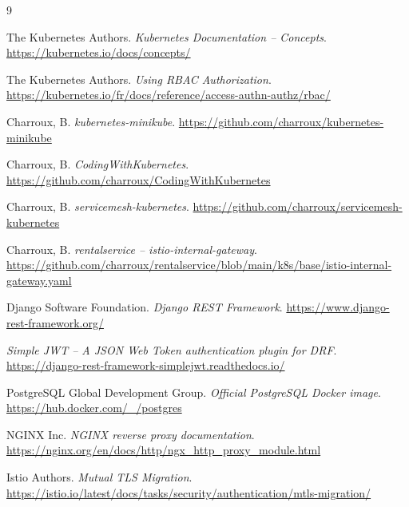 \documentclass[11pt,a4paper]{article}
\begin{document}
\renewcommand{\refname}{Références}
\begin{thebibliography}{9}

The Kubernetes Authors. \emph{Kubernetes Documentation -- Concepts}. \url{https://kubernetes.io/docs/concepts/}

The Kubernetes Authors. \emph{Using RBAC Authorization}. \url{https://kubernetes.io/fr/docs/reference/access-authn-authz/rbac/}

Charroux, B. \emph{kubernetes-minikube}. \url{https://github.com/charroux/kubernetes-minikube}

Charroux, B. \emph{CodingWithKubernetes}. \url{https://github.com/charroux/CodingWithKubernetes}

Charroux, B. \emph{servicemesh-kubernetes}. \url{https://github.com/charroux/servicemesh-kubernetes}

Charroux, B. \emph{rentalservice -- istio-internal-gateway}. \url{https://github.com/charroux/rentalservice/blob/main/k8s/base/istio-internal-gateway.yaml}

Django Software Foundation. \emph{Django REST Framework}. \url{https://www.django-rest-framework.org/}

\emph{Simple JWT -- A JSON Web Token authentication plugin for DRF}. \url{https://django-rest-framework-simplejwt.readthedocs.io/}

PostgreSQL Global Development Group. \emph{Official PostgreSQL Docker image}. \url{https://hub.docker.com/_/postgres}

NGINX Inc. \emph{NGINX reverse proxy documentation}. \url{https://nginx.org/en/docs/http/ngx_http_proxy_module.html}

Istio Authors. \emph{Mutual TLS Migration}. \url{https://istio.io/latest/docs/tasks/security/authentication/mtls-migration/}

\end{thebibliography}
\end{document}
